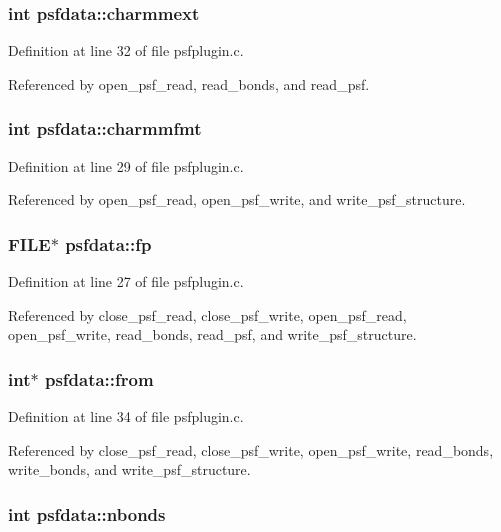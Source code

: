 \subsubsection{\setlength{\rightskip}{0pt plus 5cm}int psfdata::charmmext}\label{structpsfdata_m5}




Definition at line 32 of file psfplugin.c.

Referenced by open\_\-psf\_\-read, read\_\-bonds, and read\_\-psf.
\subsubsection{\setlength{\rightskip}{0pt plus 5cm}int psfdata::charmmfmt}\label{structpsfdata_m2}




Definition at line 29 of file psfplugin.c.

Referenced by open\_\-psf\_\-read, open\_\-psf\_\-write, and write\_\-psf\_\-structure.
\subsubsection{\setlength{\rightskip}{0pt plus 5cm}FILE$\ast$ psfdata::fp}\label{structpsfdata_m0}




Definition at line 27 of file psfplugin.c.

Referenced by close\_\-psf\_\-read, close\_\-psf\_\-write, open\_\-psf\_\-read, open\_\-psf\_\-write, read\_\-bonds, read\_\-psf, and write\_\-psf\_\-structure.
\subsubsection{\setlength{\rightskip}{0pt plus 5cm}int$\ast$ psfdata::from}\label{structpsfdata_m7}




Definition at line 34 of file psfplugin.c.

Referenced by close\_\-psf\_\-read, close\_\-psf\_\-write, open\_\-psf\_\-write, read\_\-bonds, write\_\-bonds, and write\_\-psf\_\-structure.
\subsubsection{\setlength{\rightskip}{0pt plus 5cm}int psfdata::nbonds}\label{structpsfdata_m6}




